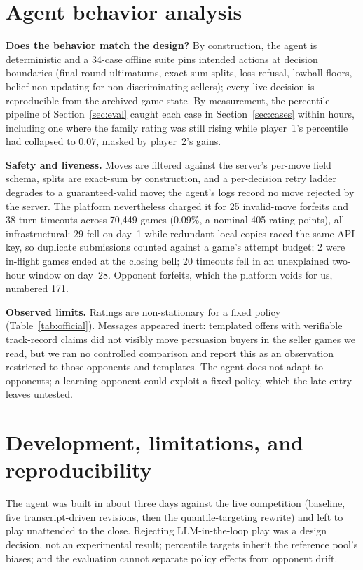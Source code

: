 \documentclass{article}
\begin{document}
\section{Agent behavior analysis}
\label{sec:analysis}

\textbf{Does the behavior match the design?} By construction, the agent is
deterministic and a 34-case offline suite pins intended actions at decision
boundaries (final-round ultimatums, exact-sum splits, loss refusal, lowball
floors, belief non-updating for non-discriminating sellers); every live
decision is reproducible from the archived game state. By measurement, the
percentile pipeline of Section~\ref{sec:eval} caught each case in
Section~\ref{sec:cases} within hours, including one where the family rating
was still rising while player~1's percentile had collapsed to $0.07$, masked
by player~2's gains.

\textbf{Safety and liveness.} Moves are filtered against the server's per-move
field schema, splits are exact-sum by construction, and a per-decision retry
ladder degrades to a guaranteed-valid move; the agent's logs record no move
rejected by the server. The platform nevertheless charged it for 25
invalid-move forfeits and 38 turn timeouts across 70{,}449 games (0.09\%,
a nominal 405 rating points), all infrastructural: 29 fell on day~1 while
redundant local copies raced the same API key, so duplicate submissions
counted against a game's attempt budget; 2 were in-flight games ended at the
closing bell; 20 timeouts fell in an unexplained two-hour window on day~28.
Opponent forfeits, which the platform voids for us, numbered 171.

\textbf{Observed limits.} Ratings are non-stationary for a fixed policy
(Table~\ref{tab:official}). Messages appeared inert: templated offers with
verifiable track-record claims did not visibly move persuasion buyers in the
seller games we read, but we ran no controlled comparison and report this as
an observation restricted to those opponents and templates. The agent does not adapt to opponents; a learning opponent could exploit a
fixed policy, which the late entry leaves untested.

\section{Development, limitations, and reproducibility}

The agent was built in about three days against the live competition
(baseline, five transcript-driven revisions, then the quantile-targeting
rewrite) and left to play unattended to the close. Rejecting LLM-in-the-loop
play was a design decision, not an experimental result; percentile targets
inherit the reference pool's biases; and the evaluation cannot separate policy
effects from opponent drift.
\end{document}
